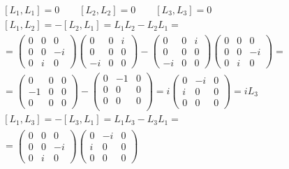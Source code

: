 \documentclass{article}
\begin{document}
\begin{equation}
\begin{gathered}
    \left[L_1,L_1\right] = 0
    \qquad
    \left[L_2,L_2\right] = 0
    \qquad
    \left[L_3,L_3\right] = 0
    \\
    \left[L_1,L_2\right] = - \left[L_2,L_1\right] = L_1L_2 - L_2L_1 = \\ = 
    \begin{pmatrix} 0 & 0 & 0 \\ 0 & 0 & -i \\ 0 & i & 0 \end{pmatrix}
    \begin{pmatrix} 0 & 0 & i \\ 0 & 0 & 0 \\ -i & 0 & 0 \end{pmatrix}
    -
    \begin{pmatrix} 0 & 0 & i \\ 0 & 0 & 0 \\ -i & 0 & 0 \end{pmatrix}
    \begin{pmatrix} 0 & 0 & 0 \\ 0 & 0 & -i \\ 0 & i & 0 \end{pmatrix}
    = \\ =
    \begin{pmatrix} 0 & 0 & 0 \\ -1 & 0 & 0 \\ 0 & 0 & 0 \end{pmatrix}
    -
    \begin{pmatrix} 0 & -1 & 0 \\ 0 & 0 & 0 \\ 0 & 0 & 0 \\ \end{pmatrix}
    = i\begin{pmatrix} 0 & -i & 0 \\ i & 0 & 0 \\ 0 & 0 & 0\end{pmatrix} = iL_3
    \\
    \left[L_1,L_3\right] = - \left[L_3,L_1\right] = L_1L_3 - L_3L_1 = \\ = 
    \begin{pmatrix} 0 & 0 & 0 \\ 0 & 0 & -i \\ 0 & i & 0 \end{pmatrix}
    \begin{pmatrix} 0 & -i & 0 \\ i & 0 & 0 \\ 0 & 0 & 0\end{pmatrix}

\end{gathered}
\end{equation}
\end{document}
